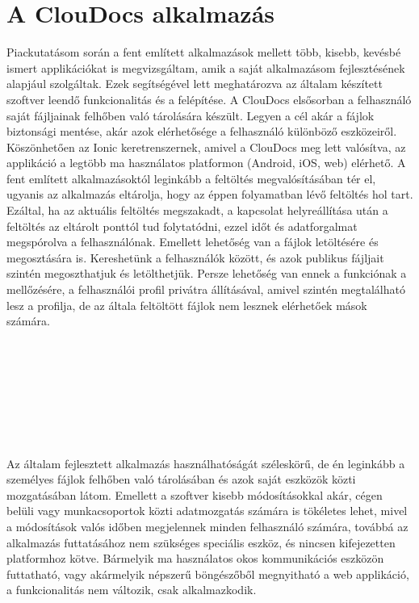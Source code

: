 \documentclass[12pt, twoside]{report}
\begin{document}
\chapter{A ClouDocs alkalmazás}
Piackutatásom során a fent említett alkalmazások mellett több, kisebb, kevésbé ismert applikációkat is megvizsgáltam, amik a saját alkalmazásom fejlesztésének alapjául szolgáltak. Ezek segítségével lett meghatározva az általam készített szoftver leendő funkcionalitás és a felépítése. A ClouDocs elsősorban a felhasználó saját fájljainak felhőben való tárolására készült. Legyen a cél akár a fájlok biztonsági mentése, akár azok elérhetősége a felhasználó különböző eszközeiről. Köszönhetően az Ionic keretrenszernek, amivel a ClouDocs meg lett valósítva, az applikáció a legtöbb ma használatos platformon (Android, iOS, web) elérhető. A fent említett alkalmazásoktól leginkább a feltöltés megvalósításában tér el, ugyanis az alkalmazás eltárolja, hogy az éppen folyamatban lévő feltöltés hol tart. Ezáltal, ha az aktuális feltöltés megszakadt, a kapcsolat helyreállítása után a feltöltés az eltárolt ponttól tud folytatódni, ezzel időt és adatforgalmat megspórolva a felhasználónak. Emellett lehetőség van a fájlok letöltésére és megosztására is. Kereshetünk a felhasználók között, és azok publikus fájljait szintén megoszthatjuk és letölthetjük. Persze lehetőség van ennek a funkciónak a mellőzésére, a felhasználói profil privátra állításával, amivel szintén megtalálható lesz a profilja, de az általa feltöltött fájlok nem lesznek elérhetőek mások számára.\\
\\
\\
\\
\\
\\
\\
\\
\\
Az általam fejlesztett alkalmazás használhatóságát széleskörű, de én leginkább a személyes fájlok felhőben való tárolásában és azok saját eszközök közti mozgatásában látom. Emellett a szoftver kisebb módosításokkal akár, cégen belüli vagy munkacsoportok közti adatmozgatás számára is tökéletes lehet, mivel a módosítások valós időben megjelennek minden felhasználó számára, továbbá az alkalmazás futtatásához nem szükséges speciális eszköz, és nincsen kifejezetten platformhoz kötve. Bármelyik ma használatos okos kommunikációs eszközön futtatható, vagy akármelyik népszerű böngészőből megnyitható a web applikáció, a funkcionalitás nem változik, csak alkalmazkodik.
\end{document}
